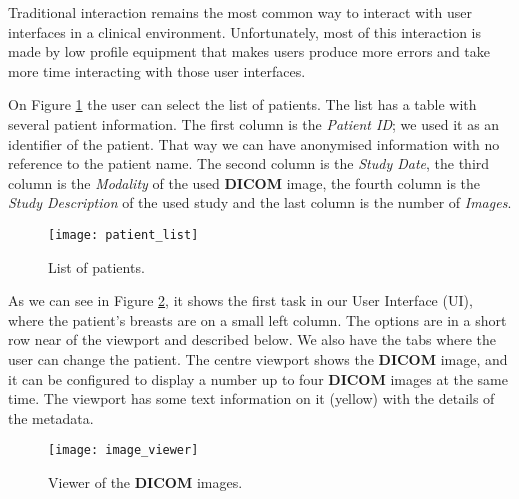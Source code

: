 Traditional interaction remains the most common way to interact with user interfaces in a clinical environment. Unfortunately, most of this interaction is made by low profile equipment that makes users produce more errors and take more time interacting with those user interfaces.

On Figure \ref{fig:patient_list} the user can select the list of patients. The list has a table with several patient information. The first column is the \textit{Patient ID}; we used it as an identifier of the patient. That way we can have anonymised information with no reference to the patient name. The second column is the \textit{Study Date}, the third column is the \textit{Modality} of the used \textbf{DICOM} image, the fourth column is the \textit{Study Description} of the used study and the last column is the number of \textit{Images}.


\hfill

\begin{figure}[h]
\centering
\texttt{[image: patient\_list]}
\caption{List of patients.}
\label{fig:patient_list}
\end{figure}

\hfill


As we can see in Figure \ref{fig:image_viewer}, it shows the first task in our User Interface (UI), where the patient's breasts are on a small left column. The options are in a short row near of the viewport and described below. We also have the tabs where the user can change the patient. The centre viewport shows the \textbf{DICOM} image, and it can be configured to display a number up to four \textbf{DICOM} images at the same time. The viewport has some text information on it (yellow) with the details of the metadata.

\clearpage


\hfill

\begin{figure}[h]
\centering
\texttt{[image: image\_viewer]}
\caption{Viewer of the \textbf{DICOM} images.}
\label{fig:image_viewer}
\end{figure}

\hfill


